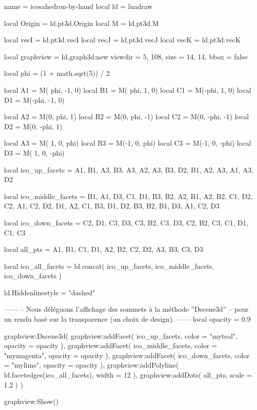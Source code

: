 \documentclass[border = 3pt]{standalone}
\begin{document}
\begin{luadraw*}{name = icosahedron-by-hand}
local ld = luadraw

local Origin = ld.pt3d.Origin
local M      = ld.pt3d.M

local vecI = ld.pt3d.vecI
local vecJ = ld.pt3d.vecJ
local vecK = ld.pt3d.vecK

local graphview = ld.graph3d:new{
  viewdir  = {5, 108},
  size     = {14, 14},
  bbox     = false
}

local phi = (1 + math.sqrt(5)) / 2

local A1 = M( phi, -1, 0)
local B1 = M( phi,  1, 0)
local C1 = M(-phi,  1, 0)
local D1 = M(-phi, -1, 0)

local A2 = M(0,  phi,  1)
local B2 = M(0,  phi, -1)
local C2 = M(0, -phi, -1)
local D2 = M(0, -phi,  1)

local A3 = M( 1, 0,  phi)
local B3 = M(-1, 0,  phi)
local C3 = M(-1, 0, -phi)
local D3 = M( 1, 0, -phi)

local ico_up_facets = {
  {A1, B1, A3},
  {B3, A3, A2},
  {A3, B3, D2},
  {B1, A2, A3},
  {A1, A3, D2}
}

local ico_middle_facets = {
  {B1, A1, D3},
  {C1, D1, B3},
  {B2, A2, B1},
  {A2, B2, C1},
  {D2, C2, A1},
  {C2, D2, D1},
  {A2, C1, B3},
  {D1, D2, B3},
  {B2, B1, D3},
  {A1, C2, D3}
}

local ico_down_facets = {
  {C2, D1, C3},
  {D3, C3, B2},
  {C3, D3, C2},
  {B2, C3, C1},
  {D1, C1, C3}
}

local all_pts = {
  A1, B1, C1, D1,
  A2, B2, C2, D2,
  A3, B3, C3, D3
}

local ico_all_facets = ld.concat(
    ico_up_facets,
    ico_middle_facets,
    ico_down_facets
  )

ld.Hiddenlinestyle = "dashed"

------
-- Nous déléguons l'affichage des sommets à la méthode ''Dscene3d''
-- pour un rendu basé sur la transparence (un choix de design).
------
local opacity = 0.9

graphview:Dscene3d(
  graphview:addFacet(
    ico_up_facets,
    {color = "myteal", opacity = opacity}
  ),
  graphview:addFacet(
    ico_middle_facets,
    {color = "mymagenta", opacity = opacity}
  ),
  graphview:addFacet(
    ico_down_facets,
    {color = "mylime", opacity = opacity}
  ),
  graphview:addPolyline(
    ld.facetedges(ico_all_facets),
    {width  = 12}
  ),
  graphview:addDots(
    all_pts,
    {scale = 1.2}
  )
)

graphview:Show()
\end{luadraw*}
\end{document}
